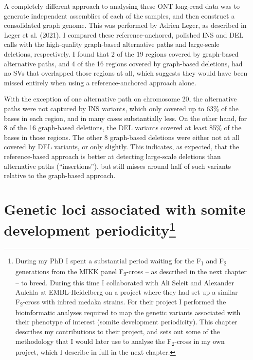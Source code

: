 \documentclass[
]{book}
\begin{document}
A completely different approach to analysing these ONT long-read data was to generate independent assemblies of each of the samples, and then construct a consolidated graph genome. This was performed by Adrien Leger, as described in Leger et al. (2021). I compared these reference-anchored, polished INS and DEL calls with the high-quality graph-based alternative paths and large-scale deletions, respectively. I found that 2 of the 19 regions covered by graph-based alternative paths, and 4 of the 16 regions covered by graph-based deletions, had no SVs that overlapped those regions at all, which suggests they would have been missed entirely when using a reference-anchored approach alone.

With the exception of one alternative path on chromosome 20, the alternative paths were not captured by INS variants, which only covered up to 63\% of the bases in each region, and in many cases substantially less. On the other hand, for 8 of the 16 graph-based deletions, the DEL variants covered at least 85\% of the bases in those regions. The other 8 graph-based deletions were either not at all covered by DEL variants, or only slightly. This indicates, as expected, that the reference-based approach is better at detecting large-scale deletions than alternative paths (``insertions''), but still misses around half of such variants relative to the graph-based approach.

\hypertarget{Somite-chap}{%
\chapter[Genetic loci associated with somite development periodicity]{\texorpdfstring{Genetic loci associated with somite development periodicity\footnote{During my PhD I spent a substantial period waiting for the F\textsubscript{1} and F\textsubscript{2} generations from the MIKK panel F\textsubscript{2}-cross -- as described in the next chapter -- to breed. During this time I collaborated with Ali Seleit and Alexander Aulehla at EMBL-Heidelberg on a project where they had set up a similar F\textsubscript{2}-cross with inbred medaka strains. For their project I performed the bioinformatic analyses required to map the genetic variants associated with their phenotype of interest (somite development periodicity). This chapter describes my contributions to their project, and sets out some of the methodology that I would later use to analyse the F\textsubscript{2}-cross in my own project, which I describe in full in the next chapter.}}{Genetic loci associated with somite development periodicity}}\label{Somite-chap}}
\end{document}
